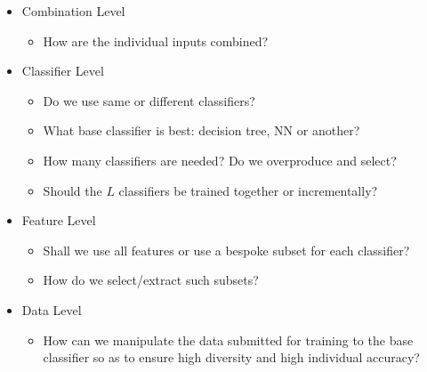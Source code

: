 \begin{itemize}
    \item Combination Level
    \begin{itemize}
        \item How are the individual inputs combined?
    \end{itemize}

    \item Classifier Level
    \begin{itemize}
        \item Do we use same or different classifiers?
        \item What base classifier is best: decision tree, NN or another?
        \item How many classifiers are needed? Do we overproduce and select?
        \item Should the $L$ classifiers be trained together or incrementally?
    \end{itemize}

    \item Feature Level
    \begin{itemize}
        \item Shall we use all features or use a bespoke subset for each classifier?
        \item How do we select/extract such subsets?
    \end{itemize}

    \item Data Level
    \begin{itemize}
        \item How can we manipulate the data submitted for training to the base classifier so as to ensure high diversity and high individual accuracy?
    \end{itemize}
\end{itemize}

\vspace{10pt}

